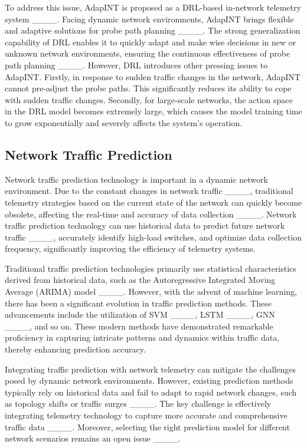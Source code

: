 To address this issue, AdapINT is proposed as a DRL-based in-network telemetry system ____. Facing dynamic network environments, AdapINT brings flexible and adaptive solutions for probe path planning ____. The strong generalization capability of DRL enables it to quickly adapt and make wise decisions in new or unknown network environments, ensuring the continuous effectiveness of probe path planning ____. However, DRL introduces other pressing issues to AdapINT. Firstly, in response to sudden traffic changes in the network, AdapINT cannot pre-adjust the probe paths. This significantly reduces its ability to cope with sudden traffic changes. Secondly, for large-scale networks, the action space in the DRL model becomes extremely large, which causes the model training time to grow exponentially and severely affects the system's operation.


\subsection{Network Traffic Prediction}


Network traffic prediction technology is important in a dynamic network environment. Due to the constant changes in network traffic ____, traditional telemetry strategies based on the current state of the network can quickly become obsolete, affecting the real-time and accuracy of data collection ____. Network traffic prediction technology can use historical data to predict future network traffic ____, accurately identify high-load switches, and optimize data collection frequency, significantly improving the efficiency of telemetry systems.


Traditional traffic prediction technologies primarily use statistical characteristics derived from historical data, such as the Autoregressive Integrated Moving Average (ARIMA) model ____. However, with the advent of machine learning, there has been a significant evolution in traffic prediction methods. These advancements include the utilization of SVM ____, LSTM ____, GNN ____, and so on. These modern methods have demonstrated remarkable proficiency in capturing intricate patterns and dynamics within traffic data, thereby enhancing prediction accuracy.


Integrating traffic prediction with network telemetry can mitigate the challenges posed by dynamic network environments. However, existing prediction methods typically rely on historical data and fail to adapt to rapid network changes, such as topology shifts or traffic surges ____. The key challenge is effectively integrating telemetry technology to capture more accurate and comprehensive traffic data ____. Moreover, selecting the right prediction model for different network scenarios remains an open issue ____.

